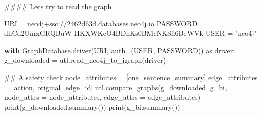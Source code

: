 \documentclass[
  italian,
  a4paper,
]{article}
\newenvironment{Shaded}{\begin{snugshade}}{\end{snugshade}}
\newcommand{\BuiltInTok}[1]{\textcolor[rgb]{0.00,0.23,0.31}{#1}}
\newcommand{\CommentTok}[1]{\textcolor[rgb]{0.37,0.37,0.37}{#1}}
\newcommand{\ControlFlowTok}[1]{\textcolor[rgb]{0.00,0.23,0.31}{\textbf{#1}}}
\newcommand{\ImportTok}[1]{\textcolor[rgb]{0.00,0.46,0.62}{#1}}
\newcommand{\NormalTok}[1]{\textcolor[rgb]{0.00,0.23,0.31}{#1}}
\newcommand{\OperatorTok}[1]{\textcolor[rgb]{0.37,0.37,0.37}{#1}}
\newcommand{\StringTok}[1]{\textcolor[rgb]{0.13,0.47,0.30}{#1}}
\begin{document}
\begin{Shaded}
\begin{Highlighting}[]
\CommentTok{\#\#\#\# Let\textquotesingle{}s try to read the graph}

\NormalTok{URI }\OperatorTok{=} \StringTok{\textquotesingle{}neo4j+ssc://2462d63d.databases.neo4j.io\textquotesingle{}}
\NormalTok{PASSWORD }\OperatorTok{=} \StringTok{\textquotesingle{}dhCd2UmxGRQBuW{-}HKXWKcO4BDnKs0BMcNKSfi6BeWVk\textquotesingle{}}
\NormalTok{USER }\OperatorTok{=} \StringTok{"neo4j"}


\ControlFlowTok{with}\NormalTok{ GraphDatabase.driver(URI, auth}\OperatorTok{=}\NormalTok{(USER, PASSWORD)) }\ImportTok{as}\NormalTok{ driver:}
\NormalTok{    g\_downloaded }\OperatorTok{=}\NormalTok{ utl.read\_neo4j\_to\_igraph(driver)}
\end{Highlighting}
\end{Shaded}

\begin{Shaded}
\begin{Highlighting}[]
\CommentTok{\#\# A safety check}
\NormalTok{node\_attributes }\OperatorTok{=}\NormalTok{ [}\StringTok{\textquotesingle{}one\_sentence\_summary\textquotesingle{}}\NormalTok{]}
\NormalTok{edge\_attributes }\OperatorTok{=}\NormalTok{ [}\StringTok{\textquotesingle{}action\textquotesingle{}}\NormalTok{, }\StringTok{\textquotesingle{}original\_edge\_id\textquotesingle{}}\NormalTok{]}
\NormalTok{utl.compare\_graphs(g\_downloaded, g\_bi, node\_attrs }\OperatorTok{=}\NormalTok{ node\_attributes, edge\_attrs }\OperatorTok{=}\NormalTok{ edge\_attributes)}
\BuiltInTok{print}\NormalTok{(g\_downloaded.summary())}
\BuiltInTok{print}\NormalTok{(g\_bi.summary())}
\end{Highlighting}
\end{Shaded}
\end{document}
